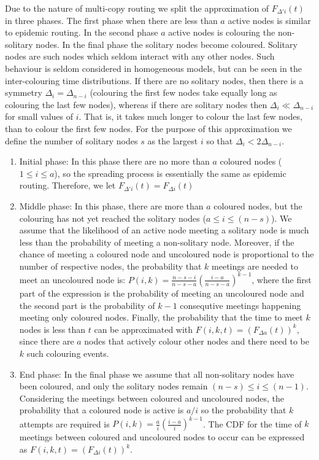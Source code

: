 \documentclass{article}
\begin{document}
Due to the nature of multi-copy routing we split the approximation of
$F_{\Delta' i}(t)$ in three phases. The first phase when there are
less than $a$ active nodes is similar to epidemic routing. In the
second phase $a$ active nodes is colouring the non-solitary nodes. In
the final phase the solitary nodes become coloured. Solitary nodes are
such nodes which seldom interact with any other nodes. Such behaviour
is seldom considered in homogeneous models, but can be seen in the
inter-colouring time distributions. If there are no solitary nodes,
then there is a symmetry $\Delta_i = \Delta_{n-i}$ (colouring the
first few nodes take equally long as colouring the last few nodes),
whereas if there are solitary nodes then $\Delta_i \ll \Delta_{n-i}$
for small values of $i$. That is, it takes much longer to colour the
last few nodes, than to colour the first few nodes. For the purpose of
this approximation we define the number of solitary nodes $s$ as the
largest $i$ so that $\Delta_i < 2\Delta_{n-i}$.

\begin{enumerate}
\item Initial phase: In this phase there are no more than $a$ coloured
  nodes ($1 \le i \le  a$), so the spreading process is essentially
  the same as epidemic routing. Therefore, we let $F_{\Delta' i} (t)=
  F_{\Delta i}(t)$
\item Middle phase: In this phase, there are more than $a$ coloured
  nodes, but the colouring has not yet reached the solitary nodes ($ a
  \le i \le (n-s)$). We assume that the likelihood of an active node
  meeting a solitary node is much less than the probability of meeting
  a non-solitary node. Moreover, if the chance of meeting a coloured
  node and uncoloured node is proportional to the number of respective
  nodes, the probability that $k$ meetings are needed to meet an
  uncoloured node is: $P(i,k) = \frac{n-s-i}{n-s-a}\left(
    \frac{i-a}{n-s-a} \right)^{k-1}$, where the first part of the
  expression is the probability of meeting an uncoloured node and the
  second part is the probability of $k-1$ consequtive meetings
  happening meeting only coloured nodes.  Finally, the probability
  that the time to meet $k$ nodes is less than $t$ can be approximated
  with $F(i,k,t) = (F_{\Delta a}(t))^k$, since there are $a$ nodes
  that actively colour other nodes and there need to be $k$ such
  colouring events.
\item End phase: In the final phase we assume that all non-solitary
  nodes have been coloured, and only the solitary nodes remain $(n-s)
  \le i \le (n-1)$. Considering the meetings between coloured and
  uncoloured nodes, the probability that a coloured node is active is
  $a/i$ so the probability that $k$ attempts are required is $P(i,k) =
  \frac{a}{i}\left( \frac{i-a}{i} \right)^{k-1}$. The CDF for the time
  of $k$ meetings between coloured and uncoloured nodes to occur can
  be expressed as $F(i,k,t) = (F_{\Delta i}(t))^k$. 
\end{enumerate}
\end{document}
